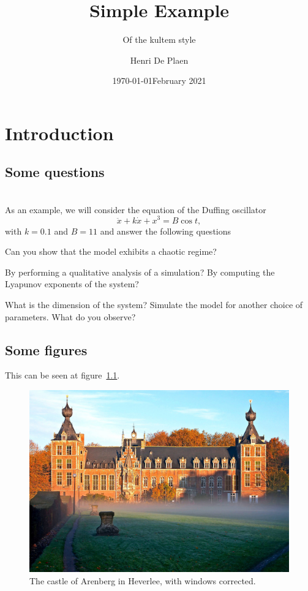 \documentclass[oneside,a4paper,11pt,explicit]{book}
\title{Simple Example}
\subtitle{Of the kultem style}
\date{\today}
\author{Henri De Plaen}
\date{February 2021}
\begin{document}
\maketitle

\chapter{Introduction}
\lipsum[1]

\section{Some questions}
\lipsum[2] \\

As an example, we will consider the equation of the Duffing oscillator
\begin{equation}
\ddot{x}+k\dot{x}+x^3=B\cos t,
\end{equation}
with $k=0.1$ and $B=11$ and answer the following questions

\begin{questions}
\question Can you show that the model exhibits a chaotic regime?
\begin{tasks}
\task By performing a qualitative analysis of a simulation?
\task By computing the Lyapunov exponents of the system?
\end{tasks}
\question What is the dimension of the system?
\question Simulate the model for another choice of parameters. What do you observe?
\end{questions}

\section{Some figures}
\lipsum[3] This can be seen at figure~\ref{fig:example}.

\begin{figure}[h]
    \centering
    \includegraphics[width=\textwidth]{./arenberg.jpg}
    \caption{The castle of Arenberg in Heverlee, with windows corrected.}
    \label{fig:example}
\end{figure}
\end{document}
